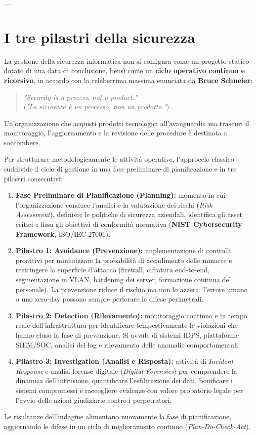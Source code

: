\documentclass[../../main.tex]{subfiles}
\begin{document}
---

\section{I tre pilastri della sicurezza}
\label{sec:tre_pilastri}

La gestione della sicurezza informatica non si configura come un progetto statico dotato di una data di conclusione, bensì come un \textbf{ciclo operativo continuo e ricorsivo}, in accordo con la celeberrima massima enunciata da \textbf{Bruce Schneier}:
\begin{quote}
\textit{"Security is a process, not a product."} \\
(\textit{"La sicurezza è un processo, non un prodotto."})
\end{quote}
Un'organizzazione che acquisti prodotti tecnologici all'avanguardia ma trascuri il monitoraggio, l'aggiornamento e la revisione delle procedure è destinata a soccombere. 

Per strutturare metodologicamente le attività operative, l'approccio classico suddivide il ciclo di gestione in una fase preliminare di pianificazione e in tre pilastri consecutivi:

\begin{enumerate}
    \item \textbf{Fase Preliminare di Pianificazione (Planning):} momento in cui l'organizzazione conduce l'analisi e la valutazione dei rischi (\textit{Risk Assessment}), definisce le politiche di sicurezza aziendali, identifica gli asset critici e fissa gli obiettivi di conformità normativa (\textbf{NIST Cybersecurity Framework}, ISO/IEC 27001).
    \item \textbf{Pilastro 1: Avoidance (Prevenzione):} implementazione di controlli proattivi per minimizzare la probabilità di accadimento delle minacce e restringere la superficie d'attacco (firewall, cifratura end-to-end, segmentazione in VLAN, hardening dei server, formazione continua del personale). La prevenzione riduce il rischio ma non lo azzera: l'errore umano o uno zero-day possono sempre perforare le difese perimetrali.
    \item \textbf{Pilastro 2: Detection (Rilevamento):} monitoraggio continuo e in tempo reale dell'infrastruttura per identificare tempestivamente le violazioni che hanno eluso la fase di prevenzione. Si avvale di sistemi IDPS, piattaforme SIEM/SOC, analisi dei log e rilevamento delle anomalie comportamentali.
    \item \textbf{Pilastro 3: Investigation (Analisi e Risposta):} attività di \textit{Incident Response} e analisi forense digitale (\textit{Digital Forensics}) per comprendere la dinamica dell'intrusione, quantificare l'esfiltrazione dei dati, bonificare i sistemi compromessi e raccogliere evidenze con valore probatorio legale per l'avvio delle azioni giudiziarie contro i perpetratori.
\end{enumerate}

Le risultanze dell'indagine alimentano nuovamente la fase di pianificazione, aggiornando le difese in un ciclo di miglioramento continuo (\textit{Plan-Do-Check-Act}).
\end{document}
